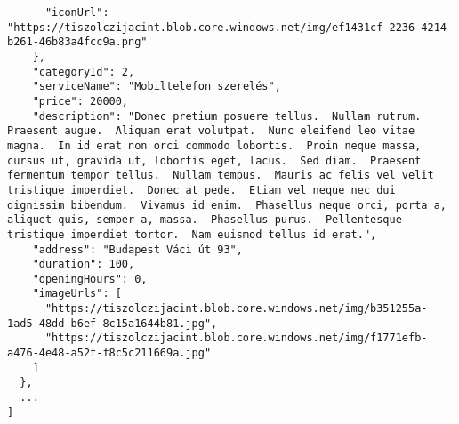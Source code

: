 \documentclass[11pt]{article}
\begin{document}
\begin{verbatim}
      "iconUrl": "https://tiszolczijacint.blob.core.windows.net/img/ef1431cf-2236-4214-b261-46b83a4fcc9a.png"
    },
    "categoryId": 2,
    "serviceName": "Mobiltelefon szerelés",
    "price": 20000,
    "description": "Donec pretium posuere tellus.  Nullam rutrum.  Praesent augue.  Aliquam erat volutpat.  Nunc eleifend leo vitae magna.  In id erat non orci commodo lobortis.  Proin neque massa, cursus ut, gravida ut, lobortis eget, lacus.  Sed diam.  Praesent fermentum tempor tellus.  Nullam tempus.  Mauris ac felis vel velit tristique imperdiet.  Donec at pede.  Etiam vel neque nec dui dignissim bibendum.  Vivamus id enim.  Phasellus neque orci, porta a, aliquet quis, semper a, massa.  Phasellus purus.  Pellentesque tristique imperdiet tortor.  Nam euismod tellus id erat.",
    "address": "Budapest Váci út 93",
    "duration": 100,
    "openingHours": 0,
    "imageUrls": [
      "https://tiszolczijacint.blob.core.windows.net/img/b351255a-1ad5-48dd-b6ef-8c15a1644b81.jpg",
      "https://tiszolczijacint.blob.core.windows.net/img/f1771efb-a476-4e48-a52f-f8c5c211669a.jpg"
    ]
  },
  ...
]
\end{verbatim}
\end{document}
